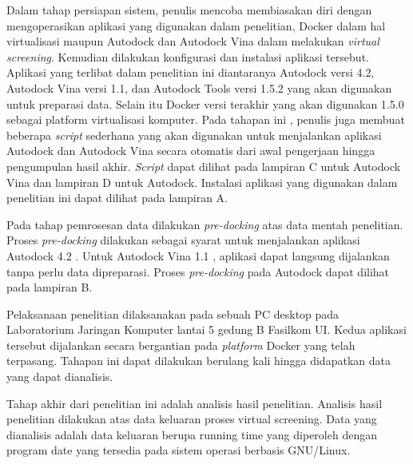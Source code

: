 Dalam tahap persiapan sistem, penulis mencoba membiasakan diri dengan mengoperasikan aplikasi yang digunakan dalam penelitian, Docker dalam hal virtualisasi maupun Autodock dan Autodock Vina dalam melakukan \textit{virtual screening}. Kemudian dilakukan konfigurasi dan instalasi aplikasi tersebut. Aplikasi yang terlibat dalam penelitian ini diantaranya Autodock versi 4.2, Autodock Vina versi 1.1, dan Autodock Tools versi 1.5.2 yang akan digunakan untuk preparasi data. Selain itu Docker versi terakhir yang akan digunakan 1.5.0 sebagai platform virtualisasi komputer. Pada tahapan ini , penulis juga membuat beberapa \textit{script} sederhana yang akan digunakan untuk menjalankan aplikasi Autodock dan Autodock Vina secara otomatis dari awal pengerjaan hingga pengumpulan hasil akhir. \textit{Script} dapat dilihat pada lampiran C  untuk Autodock Vina dan lampiran D untuk Autodock. Instalasi aplikasi yang digunakan dalam penelitian ini dapat dilihat pada lampiran A.

Pada tahap pemrosesan data dilakukan \textit{pre-docking} atas data mentah
penelitian. Proses \textit{pre-docking} dilakukan sebagai syarat untuk menjalankan aplikasi Autodock 4.2 . Untuk Autodock Vina 1.1 , aplikasi dapat langsung dijalankan tanpa perlu data dipreparasi. Proses \textit{pre-docking} pada Autodock dapat dilihat pada lampiran B.

Pelaksanaan penelitian dilaksanakan pada sebuah PC desktop pada Laboratorium Jaringan Komputer lantai 5 gedung B Fasilkom UI. Kedua aplikasi tersebut dijalankan secara bergantian pada \textit{platform} Docker yang telah terpasang. Tahapan ini dapat dilakukan berulang kali hingga didapatkan data yang dapat dianalisis.

Tahap akhir dari penelitian ini adalah analisis hasil penelitian. Analisis hasil penelitian dilakukan atas data keluaran proses virtual screening. Data yang dianalisis adalah data keluaran berupa running time yang diperoleh dengan program date yang tersedia pada sistem operasi berbasis GNU/Linux.


